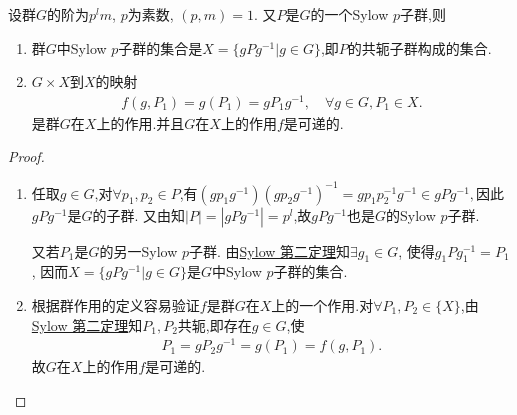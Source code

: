 \documentclass[../../main.tex]{subfiles}%
\begin{document}
\begin{corollary}\label{corollary:p群中的所有Sylow p子群}
设群$G$的阶为$p^lm$, $p$为素数, $(p,m)=1$. 又$P$是$G$的一个Sylow $p$子群,则
\begin{enumerate}[(1)]
\item\label{corollary:p群中的所有Sylow p子群-1} 群$G$中Sylow $p$子群的集合是$X=\{gPg^{-1}|g\in G\}$,即$P$的共轭子群构成的集合.

\item\label{corollary:p群中的所有Sylow p子群-2} $G\times X$到$X$的映射
\begin{align*}
f(g,P_1)=g(P_1)=gP_1g^{-1}, \quad \forall g\in G, P_1\in X.
\end{align*}
是群$G$在$X$上的作用.并且$G$在$X$上的作用$f$是可递的.
\end{enumerate}
\end{corollary}
\begin{proof}
\begin{enumerate}[(1)]
\item 任取$g\in G$,对$\forall p_1,p_2\in P$,有$(gp_1g^{-1})(gp_2g^{-1})^{-1}=gp_1p_2^{-1}g^{-1}\in gPg^{-1},$因此$gPg^{-1}$是$G$的子群.
又由知$|P|=|gPg^{-1}|=p^l$,故$gPg^{-1}$也是$G$的Sylow $p$子群.

又若$P_1$是$G$的另一Sylow $p$子群. 由\hyperref[theorem:Sylow 第二定理]{Sylow 第二定理}知$\exists g_1\in G$, 使得$g_1Pg_1^{-1}=P_1$, 因而$X=\{gPg^{-1}|g\in G\}$是$G$中Sylow $p$子群的集合.

\item 根据群作用的定义容易验证$f$是群$G$在$X$上的一个作用.对$\forall P_1,P_2\in \{X\}$,由\hyperref[theorem:Sylow 第二定理]{Sylow 第二定理}知$P_1,P_2$共轭,即存在$g\in G$,使
\begin{align*}
P_1=gP_2g^{-1}=g(P_1)=f(g,P_1).
\end{align*}
故$G$在$X$上的作用$f$是可递的.
\end{enumerate}
\end{proof}
\end{document}
